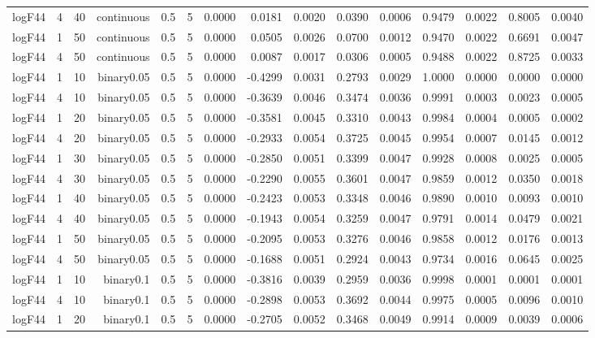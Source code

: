 \begin{longtable}{rrrrrrrrrrrrrrr}
  logF44 & 4 & 40 & continuous & 0.5 & 5 & 0.0000 & 0.0181 & 0.0020 & 0.0390 & 0.0006 & 0.9479 & 0.0022 & 0.8005 & 0.0040 \\ 
  logF44 & 1 & 50 & continuous & 0.5 & 5 & 0.0000 & 0.0505 & 0.0026 & 0.0700 & 0.0012 & 0.9470 & 0.0022 & 0.6691 & 0.0047 \\ 
  logF44 & 4 & 50 & continuous & 0.5 & 5 & 0.0000 & 0.0087 & 0.0017 & 0.0306 & 0.0005 & 0.9488 & 0.0022 & 0.8725 & 0.0033 \\ 
  logF44 & 1 & 10 & binary0.05 & 0.5 & 5 & 0.0000 & -0.4299 & 0.0031 & 0.2793 & 0.0029 & 1.0000 & 0.0000 & 0.0000 & 0.0000 \\ 
  logF44 & 4 & 10 & binary0.05 & 0.5 & 5 & 0.0000 & -0.3639 & 0.0046 & 0.3474 & 0.0036 & 0.9991 & 0.0003 & 0.0023 & 0.0005 \\ 
  logF44 & 1 & 20 & binary0.05 & 0.5 & 5 & 0.0000 & -0.3581 & 0.0045 & 0.3310 & 0.0043 & 0.9984 & 0.0004 & 0.0005 & 0.0002 \\ 
  logF44 & 4 & 20 & binary0.05 & 0.5 & 5 & 0.0000 & -0.2933 & 0.0054 & 0.3725 & 0.0045 & 0.9954 & 0.0007 & 0.0145 & 0.0012 \\ 
  logF44 & 1 & 30 & binary0.05 & 0.5 & 5 & 0.0000 & -0.2850 & 0.0051 & 0.3399 & 0.0047 & 0.9928 & 0.0008 & 0.0025 & 0.0005 \\ 
  logF44 & 4 & 30 & binary0.05 & 0.5 & 5 & 0.0000 & -0.2290 & 0.0055 & 0.3601 & 0.0047 & 0.9859 & 0.0012 & 0.0350 & 0.0018 \\ 
  logF44 & 1 & 40 & binary0.05 & 0.5 & 5 & 0.0000 & -0.2423 & 0.0053 & 0.3348 & 0.0046 & 0.9890 & 0.0010 & 0.0093 & 0.0010 \\ 
  logF44 & 4 & 40 & binary0.05 & 0.5 & 5 & 0.0000 & -0.1943 & 0.0054 & 0.3259 & 0.0047 & 0.9791 & 0.0014 & 0.0479 & 0.0021 \\ 
  logF44 & 1 & 50 & binary0.05 & 0.5 & 5 & 0.0000 & -0.2095 & 0.0053 & 0.3276 & 0.0046 & 0.9858 & 0.0012 & 0.0176 & 0.0013 \\ 
  logF44 & 4 & 50 & binary0.05 & 0.5 & 5 & 0.0000 & -0.1688 & 0.0051 & 0.2924 & 0.0043 & 0.9734 & 0.0016 & 0.0645 & 0.0025 \\ 
  logF44 & 1 & 10 & binary0.1 & 0.5 & 5 & 0.0000 & -0.3816 & 0.0039 & 0.2959 & 0.0036 & 0.9998 & 0.0001 & 0.0001 & 0.0001 \\ 
  logF44 & 4 & 10 & binary0.1 & 0.5 & 5 & 0.0000 & -0.2898 & 0.0053 & 0.3692 & 0.0044 & 0.9975 & 0.0005 & 0.0096 & 0.0010 \\ 
  logF44 & 1 & 20 & binary0.1 & 0.5 & 5 & 0.0000 & -0.2705 & 0.0052 & 0.3468 & 0.0049 & 0.9914 & 0.0009 & 0.0039 & 0.0006 \\ 

\end{longtable}
